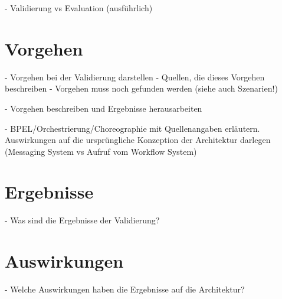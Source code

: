   - Validierung vs Evaluation (ausführlich)


\section{Vorgehen} %
\label{sec:vorgehen}

  - Vorgehen bei der Validierung darstellen
  - Quellen, die dieses Vorgehen beschreiben
  - Vorgehen muss noch gefunden werden (siehe auch Szenarien!)
  
  - Vorgehen beschreiben und Ergebnisse herausarbeiten

  - BPEL/Orchestrierung/Choreographie mit Quellenangaben erläutern. Auswirkungen auf die ursprüngliche Konzeption der Architektur darlegen (Messaging System vs Aufruf vom Workflow System)


\section{Ergebnisse} %
\label{sec:ergebnisse}

  - Was sind die Ergebnisse der Validierung?


\section{Auswirkungen} %
\label{sec:auswirkungen}

  - Welche Auswirkungen haben die Ergebnisse auf die Architektur?


